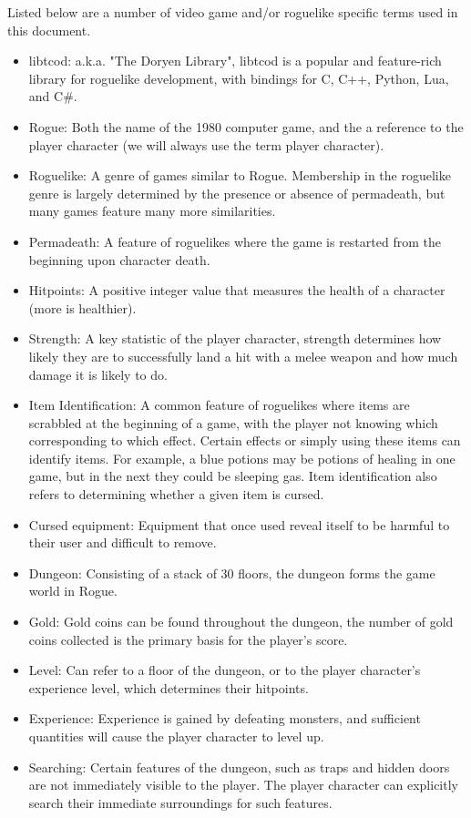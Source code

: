 \documentclass[12pt, titlepage]{article}
\begin{document}
	Listed below are a number of video game and/or roguelike specific terms used in this document. 
	\begin{itemize}
	\item libtcod: a.k.a. "The Doryen Library", libtcod is a popular and feature-rich library for roguelike development, with bindings for C, C++, Python, Lua, and C\#. 
	\item Rogue: Both the name of the 1980 computer game, and the a reference to the player character (we will always use the term player character).
	\item Roguelike: A genre of games similar to Rogue. Membership in the roguelike genre is largely determined by the presence or absence of permadeath, but many games feature many more similarities.
	\item Permadeath: A feature of roguelikes where the game is restarted from the beginning upon character death.
	\item Hitpoints: A positive integer value that measures the health of a character (more is healthier).
	\item Strength: A key statistic of the player character, strength determines how likely they are to successfully land a hit with a melee weapon and how much damage it is likely to do.
	\item Item Identification: A common feature of roguelikes where items are scrabbled at the beginning of a game, with the player not knowing which corresponding to which effect. Certain effects or simply using these items can identify items. For example, a blue potions may be potions of healing in one game, but in the next they could be sleeping gas. Item identification also refers to determining whether a given item is cursed.
	\item Cursed equipment: Equipment that once used reveal itself to be harmful to their user and difficult to remove.
	\item Dungeon: Consisting of a stack of 30 floors, the dungeon forms the game world in Rogue.
	\item Gold: Gold coins can be found throughout the dungeon, the number of gold coins collected is the primary basis for the player's score.
	\item Level: Can refer to a floor of the dungeon, or to the player character's experience level, which determines their hitpoints.
	\item Experience: Experience is gained by defeating monsters, and sufficient quantities will cause the player character to level up.
	\item Searching: Certain features of the dungeon, such as traps and hidden doors are not immediately visible to the player. The player character can explicitly search their immediate surroundings for such features.
	\end{itemize}
\end{document}
